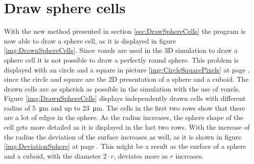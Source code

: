 \section{Draw sphere cells}
With the new method presented in section \ref{sec:DrawSphereCells} the program is now able to draw a sphere cell, as it is displayed in figure \ref{img:DrawnSphereCells}. \newline
Since voxels are used in the 3D simulation to draw a sphere cell it is not possible to draw a perfectly round sphere. This problem is displayed with an circle and a square in picture \ref{img:CircleSquarePixels} at page \pageref{img:CircleSquarePixels}, since the circle and square are the 2D presentation of a sphere and a cuboid. The drawn cells are as spherish as possible in the simulation with the use of voxels. \newline
Figure \ref{img:DrawnSphereCells} displays independently drawn cells with different radius of \SI{5}{\micro\metre} and up to \SI{23}{\micro\metre}. The cells in the first two rows show that there are a lot of edges in the sphere. As the radius increases, the sphere shape of the cell gets more detailed as it is displayed in the last two rows. With the increase of the radius the deviation of the surface increases as well, as it is shown in figure \ref{img:DeviationSphere} at page \pageref{img:DeviationSphere}. This might be a result as the surface of a sphere and a cuboid, with the diameter $2 \cdot r$, deviates more as $r$ increases.


